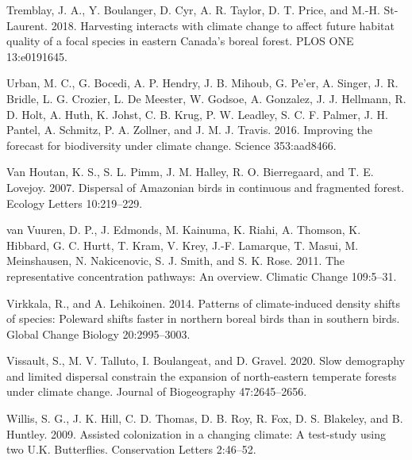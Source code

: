 \documentclass[12pt]{article}
\newlength{\cslhangindent}
\newenvironment{cslreferences}%
  {\setlength{\parindent}{0pt}%
  \everypar{\setlength{\hangindent}{\cslhangindent}}\ignorespaces}%
  {\par}
\begin{document}
\begin{cslreferences}
\leavevmode\hypertarget{ref-tremblay_harvesting_2018}{}%
Tremblay, J. A., Y. Boulanger, D. Cyr, A. R. Taylor, D. T. Price, and
M.-H. St-Laurent. 2018. Harvesting interacts with climate change to
affect future habitat quality of a focal species in eastern Canada's
boreal forest. PLOS ONE 13:e0191645.

\leavevmode\hypertarget{ref-urban_improving_2016}{}%
Urban, M. C., G. Bocedi, A. P. Hendry, J. B. Mihoub, G. Pe'er, A.
Singer, J. R. Bridle, L. G. Crozier, L. De Meester, W. Godsoe, A.
Gonzalez, J. J. Hellmann, R. D. Holt, A. Huth, K. Johst, C. B. Krug, P.
W. Leadley, S. C. F. Palmer, J. H. Pantel, A. Schmitz, P. A. Zollner,
and J. M. J. Travis. 2016. Improving the forecast for biodiversity under
climate change. Science 353:aad8466.

\leavevmode\hypertarget{ref-van_houtan_dispersal_2007}{}%
Van Houtan, K. S., S. L. Pimm, J. M. Halley, R. O. Bierregaard, and T.
E. Lovejoy. 2007. Dispersal of Amazonian birds in continuous and
fragmented forest. Ecology Letters 10:219--229.

\leavevmode\hypertarget{ref-van_vuuren_representative_2011}{}%
van Vuuren, D. P., J. Edmonds, M. Kainuma, K. Riahi, A. Thomson, K.
Hibbard, G. C. Hurtt, T. Kram, V. Krey, J.-F. Lamarque, T. Masui, M.
Meinshausen, N. Nakicenovic, S. J. Smith, and S. K. Rose. 2011. The
representative concentration pathways: An overview. Climatic Change
109:5--31.

\leavevmode\hypertarget{ref-virkkala_patterns_2014}{}%
Virkkala, R., and A. Lehikoinen. 2014. Patterns of climate-induced
density shifts of species: Poleward shifts faster in northern boreal
birds than in southern birds. Global Change Biology 20:2995--3003.

\leavevmode\hypertarget{ref-vissault_slow_2020}{}%
Vissault, S., M. V. Talluto, I. Boulangeat, and D. Gravel. 2020. Slow
demography and limited dispersal constrain the expansion of
north-eastern temperate forests under climate change. Journal of
Biogeography 47:2645--2656.

\leavevmode\hypertarget{ref-willis_assisted_2009}{}%
Willis, S. G., J. K. Hill, C. D. Thomas, D. B. Roy, R. Fox, D. S.
Blakeley, and B. Huntley. 2009. Assisted colonization in a changing
climate: A test-study using two U.K. Butterflies. Conservation Letters
2:46--52.
\end{cslreferences}


\newpage
\end{document}
